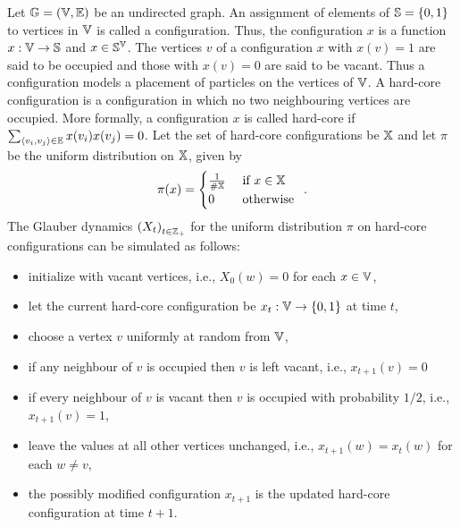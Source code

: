 \begin{model}\label{M:GlauberDynamicsHardcore}
Let $\mathbb{G} = (\mathbb{V},\mathbb{E})$ be an undirected graph.  
An assignment of elements of $\mathbb{S}=\{0,1\}$ to vertices in $\mathbb{V}$ is called a configuration.  
Thus, the configuration $x$ is a function $x: \mathbb{V} \to \mathbb{S}$ and $x \in \mathbb{S}^{\mathbb{V}}$. 
The vertices $v$ of a configuration $x$ with $x(v)=1$ are said to be occupied and those with $x(v)=0$ are said to be vacant.  
Thus a configuration models a placement of particles on the vertices of $\mathbb{V}$.  
A hard-core configuration is a configuration in which no two neighbouring vertices are occupied.  
More formally, a configuration $x$ is called hard-core if $\sum_{\langle v_i ,v_j \rangle \in \mathbb{E}} x(v_i) x(v_j)=0$.  
Let the set of hard-core configurations be $\mathbb{X}$ and let $\pi$ be the uniform distribution on $\mathbb{X}$, given by
\[
\pi(x) = 
\begin{cases}
\frac{1}{\# \mathbb{X}} & \text{ if } x \in \mathbb{X} \\
0 & \text{ otherwise}
\end{cases} \enspace .
\] 
The Glauber dynamics $\left(X_t\right)_{t \in \mathbb{Z}_+}$ for the uniform distribution $\pi$ on hard-core configurations can be simulated as follows: 
\begin{itemize}
\item initialize with vacant vertices, i.e., $X_0(w)=0$ for each $x \in \mathbb{V}$,
\item let the current hard-core configuration be $x_t: \mathbb{V} \to \{0,1\}$ at time $t$,
\item choose a vertex $v$ uniformly at random from $\mathbb{V}$,
\item if any neighbour of $v$ is occupied then $v$ is left vacant, i.e., $x_{t+1}(v)=0$
\item if every neighbour of $v$ is vacant then $v$ is occupied with probability $1/2$, i.e., $x_{t+1}(v)=1$, 
\item leave the values at all other vertices unchanged, i.e., $x_{t+1}(w)=x_t(w)$ for each $w \neq v$, 
\item the possibly modified configuration $x_{t+1}$ is the updated hard-core configuration at time $t+1$.
\end{itemize}
\end{model}


